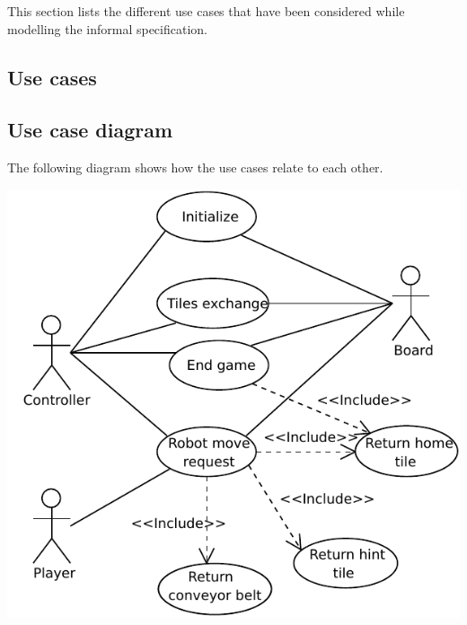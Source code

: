 This section lists the different use cases that have been considered while modelling the informal specification.
\subsection{Use cases}
	
\subsection{Use case diagram}
	\begin{minipage}{\linewidth}
		The following diagram shows how the use cases relate to each other.

		\includegraphics[width=\linewidth]{usecases/diagram.pdf}
	\end{minipage}

